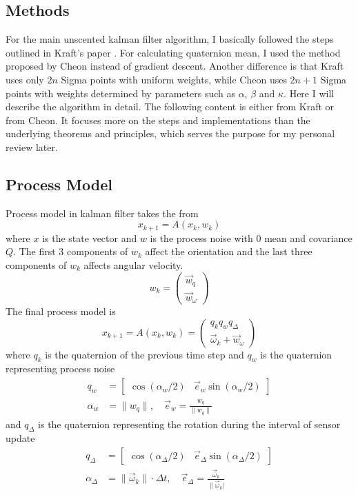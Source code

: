 \documentclass[twoside]{article}
\begin{document}
\begin{multicols}{2}
\section{Methods}
For the main unscented kalman filter algorithm, I basically followed the steps outlined in Kraft's paper \cite{Kraft03}. For calculating quaternion mean, I used the method proposed by Cheon \cite{Cheon07} instead of gradient descent. Another difference is that Kraft uses only $2n$ Sigma points with uniform weights, while Cheon uses $2n+1$ Sigma points with weights determined by parameters such as $\alpha$, $\beta$ and $\kappa$. Here I will describe the algorithm in detail. The following content is either from Kraft or from Cheon. It focuses more on the steps and implementations than the underlying theorems and principles, which serves the purpose for my personal review later.

\subsection{Process Model}
Process model in kalman filter takes the from
\begin{equation}
x_{k+1} = A(x_k, w_k)    
\end{equation}
where $x$ is the state vector and $w$ is the process noise with $0$ mean and covariance $Q$. The first 3 components of $w_k$ affect the orientation and the last three components of $w_k$ affects angular velocity.
\begin{equation}
w_k = \begin{pmatrix}\vec{w}_q \\ \vec{w}_\omega \end{pmatrix}
\end{equation}
The final process model is 
\begin{equation}
x_{k+1} = A(x_k, w_k) = \begin{pmatrix} q_k q_w q_{\Delta}\\ \vec{\omega}_k + \vec{w}_\omega \end{pmatrix}
\end{equation}
where $q_k$ is the quaternion of the previous time step and $q_w$ is the quaternion representing process noise
\begin{align}
q_w &= \begin{bmatrix}
\cos\left(\alpha_w/2\right) & \vec{e}_w \sin \left(\alpha_w/2 \right)\end{bmatrix}\\
\alpha_w &= \|w_q\|, \quad \vec{e}_w = \frac{w_q}{\|w_q\|}
\end{align}
and $q_\Delta$ is the quaternion representing the rotation during the interval of sensor update
\begin{align}
q_\Delta &= \begin{bmatrix}
\cos\left(\alpha_\Delta/2\right) & \vec{e}_\Delta \sin \left(\alpha_\Delta/2\right)\end{bmatrix}\\
\alpha_\Delta &= \|\vec{\omega}_k\|\cdot \Delta t, \quad \vec{e}_\Delta = \frac{\vec{\omega}_k}{\|\vec{\omega}_k|}
\end{align}


\end{multicols}
\end{document}
